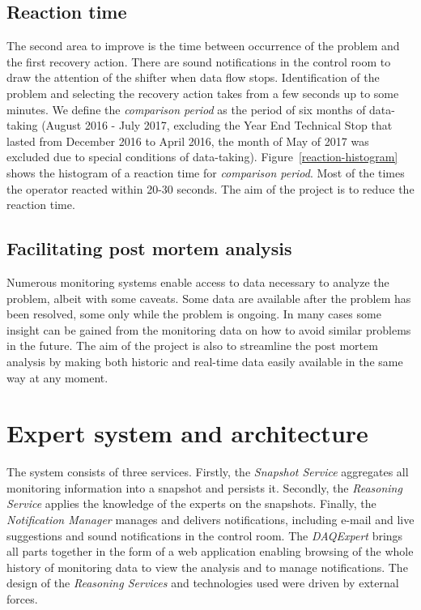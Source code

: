 \documentclass[a4paper]{jpconf}
\begin{document}
\subsection{Reaction time} \label{reaction-section}
The second area to improve is the time between occurrence of the problem and the first recovery action. There are sound notifications in the control room to draw the attention of the shifter when data flow stops. Identification of the problem and selecting the recovery action takes from a few seconds up to some minutes. We define the {\it comparison period} as the period of six months of data-taking (August 2016 - July 2017, excluding the Year End Technical Stop that lasted from December 2016 to April 2016, the month of May of 2017 was excluded due to special conditions of data-taking). Figure~\ref{reaction-histogram} shows the histogram of a reaction time for {\it comparison period}. Most of the times the operator reacted within 20-30 seconds. The aim of the project is to reduce the reaction time.


\subsection{Facilitating post mortem analysis}
Numerous monitoring systems enable access to data necessary to analyze the problem, albeit with some caveats. Some data are available after the problem has been resolved, some only while the problem is ongoing. In many cases some insight can be gained from the monitoring data on how to avoid similar problems in the future. The aim of the project is also to streamline the post mortem analysis by making both historic and real-time data easily available in the same way at any moment.



\section{Expert system and architecture}

The system consists of three services. Firstly, the {\it Snapshot Service} aggregates all monitoring information into a snapshot and persists it. Secondly, the { \it Reasoning Service} applies the knowledge of the experts on the snapshots. Finally, the { \it Notification Manager } manages and delivers notifications, including e-mail and live suggestions and sound notifications in the control room. The { \it DAQExpert } brings all parts together in the form of a web application enabling browsing of the whole history of monitoring data to view the analysis and to manage notifications. The design of the {\it Reasoning Services} and technologies used were driven by external forces.
\end{document}
